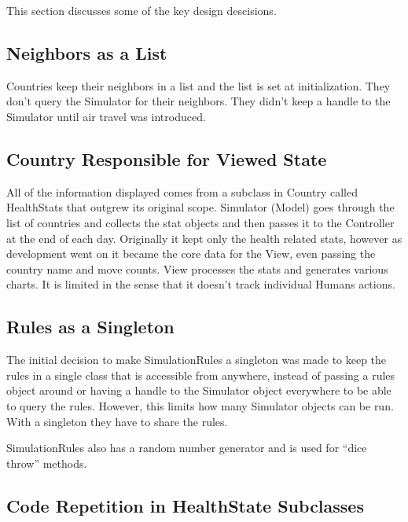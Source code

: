 \documentclass[]{article}
\begin{document}
This section discusses some of the key design descisions.

\subsection{Neighbors as a List}\label{neighbors-as-a-list}

Countries keep their neighbors in a list and the list is set at
initialization. They don't query the Simulator for their neighbors. They
didn't keep a handle to the Simulator until air travel was introduced.

\subsection{Country Responsible for Viewed
State}\label{country-responsible-for-viewed-state}

All of the information displayed comes from a subclass in Country called
HealthStats that outgrew its original scope. Simulator (Model) goes
through the list of countries and collects the stat objects and then
passes it to the Controller at the end of each day. Originally it kept
only the health related stats, however as development went on it became
the core data for the View, even passing the country name and move
counts. View processes the stats and generates various charts. It is
limited in the sense that it doesn't track individual Humans actions.

\subsection{Rules as a Singleton}\label{rules-as-a-singleton}

The initial decision to make SimulationRules a singleton was made to
keep the rules in a single class that is accessible from anywhere,
instead of passing a rules object around or having a handle to the
Simulator object everywhere to be able to query the rules. However, this
limits how many Simulator objects can be run. With a singleton they have
to share the rules.

SimulationRules also has a random number generator and is used for
``dice throw'' methods.

\subsection{Code Repetition in HealthState
Subclasses}\label{code-repetition-in-healthstate-subclasses}
\end{document}
